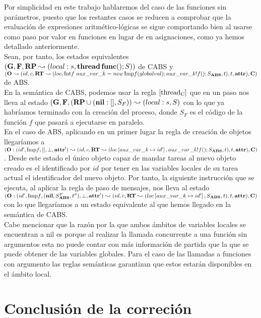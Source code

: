 Por simplicidad en este trabajo hablaremos del caso de las funciones sin parámetros, puesto que los restantes casos se reducen a comprobar que la evaluación de expresiones aritmético-lógicas se sigue comportando bien al usarse como paso por valor en funciones en lugar de en asignaciones, como ya hemos detallado anteriormente.\\

Sean, por tanto, los estados equivalentes $(\mathbf{G}, \mathbf{F}, \textbf{RP} \leadsto (local:s, \textbf{thread} \,\textbf{func}()\mbox{;\,}S))$ de CABS y $(\mathbf{O} \leadsto (id, c, \textbf{RT} \leadsto (loc,  \mbox{Int$f$ } aux\_var\_k = new\, \mbox{Imp$f$}(globalval)\mbox{;\,} aux\_var\_k!f()\mbox{;\,} S_{\textbf{ABS}}, t), t, \textbf{attr}), \mathbf{C})$ de ABS.\\

En la semántica de CABS, podemos usar la regla $\left[ \text{thread}_{\text{C}} \right]$ que en un paso nos lleva al estado $(\mathbf{G}, \mathbf{F}, (\textbf{RP} \cup (\textbf{nil}:[], S_F)) \leadsto (local:s, S)$ con lo que ya habríamos terminado con la creación del proceso, donde $S_F$ es el código de la función $f$ que pasará a ejecutarse en paralelo.\\

En el caso de ABS, aplicando en un primer lugar la regla de creación de objetos llegaríamos a $(\mathbf{O}:(id', \mbox{Imp$f$}, [], \perp, \textbf{attr}') \leadsto (id, c, \textbf{RT} \leadsto (loc \left[ aux\_var\_k\mapsto id' \right], aux\_var\_k!f()\mbox{;\,} S_{\textbf{ABS}}, t), t, \textbf{attr}), \mathbf{C})$. Desde este estado el único objeto capaz de mandar tareas al nuevo objeto creado es el identificado por $id$ por tener en las variables locales de su tarea actual el identificador del nuevo objeto. Por tanto, la siguiente instrucción que se ejecuta, al aplicar la regla de paso de mensajes, nos lleva al estado $(\mathbf{O}:(id', \mbox{Imp$f$}, (\textbf{nil}, S_{\textbf{ABS}}^F, t''), \perp, \textbf{attr}') \leadsto (id, c, \textbf{RT} \leadsto (loc \left[ aux\_var\_k\mapsto id' \right], S_{\textbf{ABS}}, t), t, \textbf{attr}), \mathbf{C})$ con lo que llegaríamos a un estado equivalente al que hemos llegado en la semántica de CABS.\\

Cabe mencionar que la razón por la que ambos ámbitos de variables locales se encuentran a nil es porque al realizar la llamada concurrente a una función sin argumentos esta no puede contar con más información de partida que la que se puede obtener de las variables globales. Para el caso de las llamadas a funciones con argumento las reglas semánticas garantizan que estos estarán disponibles en el ámbito local.

\section{Conclusión de la correción}

